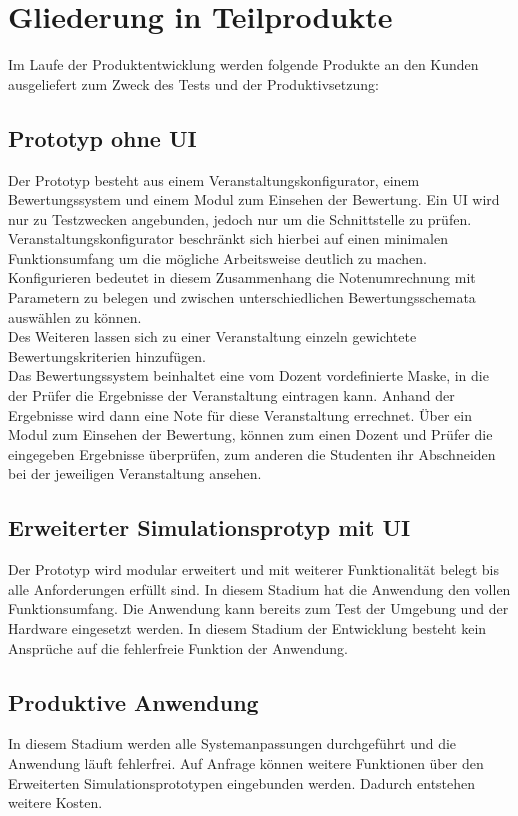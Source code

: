 	\section{Gliederung in Teilprodukte}
	
	Im Laufe der Produktentwicklung werden folgende Produkte an den Kunden ausgeliefert zum Zweck des Tests und der Produktivsetzung:
	
	\subsection{Prototyp ohne UI}
	Der Prototyp besteht aus einem  Veranstaltungskonfigurator, einem Bewertungssystem und einem Modul zum Einsehen der Bewertung. Ein UI wird nur zu Testzwecken angebunden, jedoch nur um die Schnittstelle zu prüfen. \\
	Veranstaltungskonfigurator beschränkt sich hierbei auf einen minimalen Funktionsumfang um die mögliche Arbeitsweise deutlich zu machen.\\ 
	Konfigurieren bedeutet in diesem Zusammenhang die Notenumrechnung mit Parametern zu belegen und zwischen unterschiedlichen Bewertungsschemata auswählen zu können.\\ 
	Des Weiteren lassen sich zu einer Veranstaltung einzeln gewichtete Bewertungskriterien hinzufügen.\\ 
	Das Bewertungssystem beinhaltet eine vom Dozent vordefinierte Maske, in die der Prüfer die Ergebnisse der Veranstaltung eintragen kann. Anhand der Ergebnisse wird dann eine Note für diese Veranstaltung errechnet.
	Über ein Modul zum Einsehen der Bewertung, können zum einen Dozent und Prüfer die eingegeben Ergebnisse überprüfen, zum anderen die Studenten ihr Abschneiden bei der jeweiligen Veranstaltung ansehen.
	
	\subsection{Erweiterter Simulationsprotyp mit UI}
	Der Prototyp wird modular erweitert und mit weiterer Funktionalität belegt bis alle Anforderungen erfüllt sind. In diesem Stadium hat die Anwendung den vollen Funktionsumfang. Die Anwendung kann bereits zum Test der Umgebung und der Hardware eingesetzt werden. 
	In diesem Stadium der Entwicklung besteht kein Ansprüche auf die fehlerfreie Funktion der Anwendung.
	
	\subsection{Produktive Anwendung}
	In diesem Stadium werden alle Systemanpassungen durchgeführt und die Anwendung läuft fehlerfrei. Auf Anfrage können weitere Funktionen über den Erweiterten Simulationsprototypen eingebunden werden. Dadurch entstehen weitere Kosten.
	
